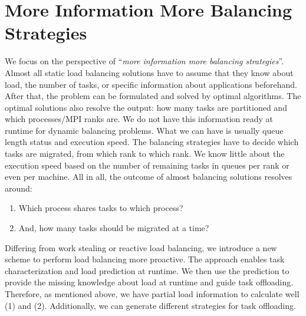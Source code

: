 \section{More Information More Balancing Strategies}
\label{sec:PADLB-proactstrategies}

We focus on the perspective of ``\textit{more information more balancing strategies}''. Almost all static load balancing solutions have to assume that they know about load, the number of tasks, or specific information about applications beforehand. After that, the problem can be formulated and solved by optimal algorithms. The optimal solutions also resolve the output: how many tasks are partitioned and which processes/MPI ranks are. We do not have this information ready at runtime for dynamic balancing problems. What we can have is usually queue length status and execution speed. The balancing strategies have to decide which tasks are migrated, from which rank to which rank. We know little about the execution speed based on the number of remaining tasks in queues per rank or even per machine. All in all, the outcome of almost balancing solutions resolves around:
\begin{enumerate}
	\item Which process shares tasks to which process?
	\item And, how many tasks should be migrated at a time?
\end{enumerate}

Differing from work stealing or reactive load balancing, we introduce a new scheme to perform load balancing more proactive. The approach enables task characterization and load prediction at runtime. We then use the prediction to provide the missing knowledge about load at runtime and guide task offloading. Therefore, as mentioned above, we have partial load information to calculate well (1) and (2). Additionally, we can generate different strategies for task offloading.\\

